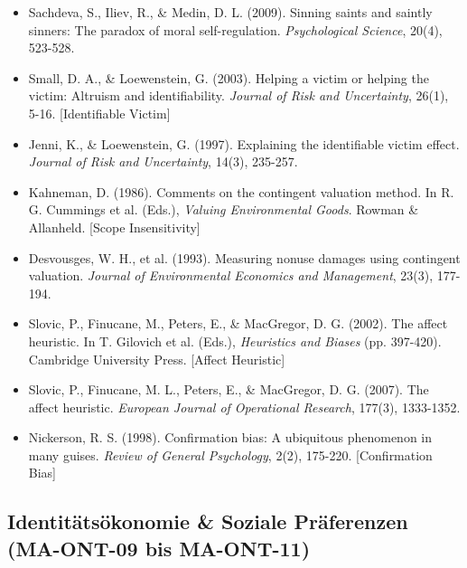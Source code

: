 \begin{itemize}[leftmargin=*]
    \item Sachdeva, S., Iliev, R., \& Medin, D. L. (2009). Sinning saints and saintly sinners: The paradox of moral self-regulation. \textit{Psychological Science}, 20(4), 523-528.
    \item Small, D. A., \& Loewenstein, G. (2003). Helping a victim or helping the victim: Altruism and identifiability. \textit{Journal of Risk and Uncertainty}, 26(1), 5-16. [Identifiable Victim]
    \item Jenni, K., \& Loewenstein, G. (1997). Explaining the identifiable victim effect. \textit{Journal of Risk and Uncertainty}, 14(3), 235-257.
    \item Kahneman, D. (1986). Comments on the contingent valuation method. In R. G. Cummings et al. (Eds.), \textit{Valuing Environmental Goods}. Rowman \& Allanheld. [Scope Insensitivity]
    \item Desvousges, W. H., et al. (1993). Measuring nonuse damages using contingent valuation. \textit{Journal of Environmental Economics and Management}, 23(3), 177-194.
    \item Slovic, P., Finucane, M., Peters, E., \& MacGregor, D. G. (2002). The affect heuristic. In T. Gilovich et al. (Eds.), \textit{Heuristics and Biases} (pp. 397-420). Cambridge University Press. [Affect Heuristic]
    \item Slovic, P., Finucane, M. L., Peters, E., \& MacGregor, D. G. (2007). The affect heuristic. \textit{European Journal of Operational Research}, 177(3), 1333-1352.
    \item Nickerson, R. S. (1998). Confirmation bias: A ubiquitous phenomenon in many guises. \textit{Review of General Psychology}, 2(2), 175-220. [Confirmation Bias]
\end{itemize}

\subsection*{Identitätsökonomie \& Soziale Präferenzen (MA-ONT-09 bis MA-ONT-11)}

